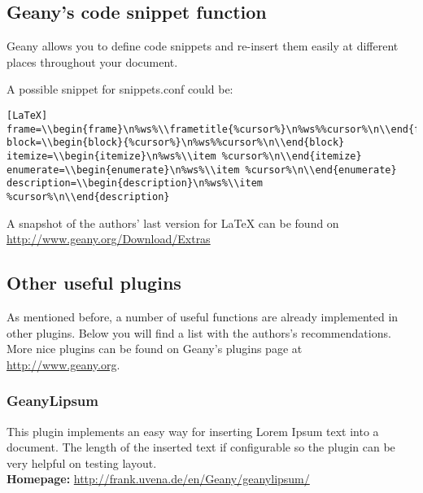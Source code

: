 \documentclass[%
paper=a4,%
fontsize=11pt,%
twoside=false,%
DIV18,%
headsepline,%
plainheadsepline,%
footsepline,%
plainfootsepline,%
bibliography=totoc,%
listof=totoc,%
BCOR10mm,%
parskip=half,%
openany,%
]{scrartcl}
\begin{document}
\subsection{Geany's code snippet function}
Geany allows you to define code snippets and re-insert them easily
at different places throughout your document.

A possible snippet for snippets.conf could be:

\begin{lstlisting}[caption={Minimal snippets.conf for \LaTeX{}}]
[LaTeX]
frame=\\begin{frame}\n%ws%\\frametitle{%cursor%}\n%ws%%cursor%\n\\end{frame}
block=\\begin{block}{%cursor%}\n%ws%%cursor%\n\\end{block}
itemize=\\begin{itemize}\n%ws%\\item %cursor%\n\\end{itemize}
enumerate=\\begin{enumerate}\n%ws%\\item %cursor%\n\\end{enumerate}
description=\\begin{description}\n%ws%\\item %cursor%\n\\end{description}
\end{lstlisting}

A snapshot of the authors' last version for LaTeX can be found on
\url{http://www.geany.org/Download/Extras}

\subsection{Other useful plugins}
As mentioned before, a number of useful functions are already
implemented in other plugins. Below you will find a list with the
authors's recommendations. More nice plugins can be found on Geany's
plugins page at \url{http://www.geany.org}.

\subsubsection{GeanyLipsum}
This plugin implements an easy way for inserting Lorem Ipsum text into
a document. The length of the inserted text if configurable so the
plugin can be very helpful on testing layout.\\
\textbf{Homepage:} \url{http://frank.uvena.de/en/Geany/geanylipsum/}
\end{document}

